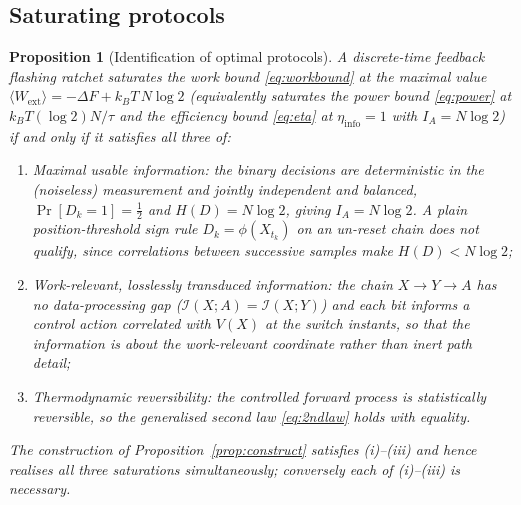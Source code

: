 \documentclass{amsart}
\newtheorem{proposition}{Proposition}
\theoremstyle{definition}
\newcommand{\kB}{k_{B}}
\newcommand{\Wext}{\langle W_{\mathrm{ext}}\rangle}
\begin{document}
\subsection{Saturating protocols}

\begin{proposition}[Identification of optimal protocols]\label{prop:opt}
A discrete-time feedback flashing ratchet saturates the work bound
\eqref{eq:workbound} at the maximal value $\Wext=-\Delta F+\kB T\,N\log2$
(equivalently saturates the power bound \eqref{eq:power} at
$\kB T(\log2)N/\tau$ and the efficiency bound \eqref{eq:eta} at
$\eta_{\mathrm{info}}=1$ with $I_A=N\log2$) if and only if it satisfies all
three of:
\begin{enumerate}
\item[\textup{(i)}] \emph{Maximal usable information}: the binary decisions are
deterministic in the (noiseless) measurement and \emph{jointly independent} and
balanced, $\Pr[D_k=1]=\tfrac12$ and $H(D)=N\log2$, giving $I_A=N\log2$. \emph{A
plain position-threshold sign rule $D_k=\phi(X_{t_k})$ on an un-reset chain
does not qualify}, since correlations between successive samples make
$H(D)<N\log2$;
\item[\textup{(ii)}] \emph{Work-relevant, losslessly transduced information}:
the chain $X\to Y\to A$ has no data-processing gap
($\mathcal I(X;A)=\mathcal I(X;Y)$) \emph{and} each bit informs a control
action correlated with $V(X)$ at the switch instants, so that the information is
about the work-relevant coordinate rather than inert path detail;
\item[\textup{(iii)}] \emph{Thermodynamic reversibility}: the controlled
forward process is statistically reversible, so the generalised second law
\eqref{eq:2ndlaw} holds with equality.
\end{enumerate}
The construction of Proposition~\ref{prop:construct} satisfies
\textup{(i)--(iii)} and hence realises all three saturations simultaneously;
conversely each of \textup{(i)--(iii)} is necessary.
\end{proposition}
\end{document}
